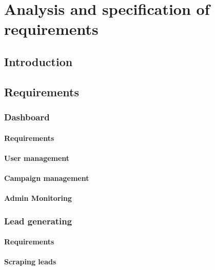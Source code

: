 \chapter{Analysis and specification of requirements}
\newpage

\setcounter{secnumdepth}{0} %
\section{Introduction}
\lipsum[2]

\setcounter{secnumdepth}{3} %

\section{Requirements}
\subsection{Dashboard}
\subsubsection{Requirements}
\subsubsection{User management}
\subsubsection{Campaign management}
\subsubsection{Admin Monitoring}
\subsection{Lead generating}
\subsubsection{Requirements}
\subsubsection{Scraping leads}

